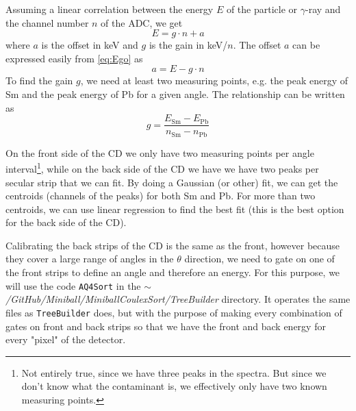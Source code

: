 \documentclass[twoside,english]{uiofysmaster/uiofysmaster}
\newcommand{\ga}{$\gamma$}
\begin{document}
Assuming a linear correlation between the energy $E$ of the particle or \ga-ray and the channel number $n$ of the ADC, we get
\begin{equation}\label{eq:Ego}
	E = g \cdot n + a
\end{equation}
where $a$ is the offset in keV and $g$ is the gain in keV/$n$. 
The offset $a$ can be expressed easily from \autoref{eq:Ego} as 
\begin{equation}\label{eq:offset}
	a = E - g \cdot n 
\end{equation}
To find the gain $g$, we need at least two measuring points, e.g. the peak energy of Sm and the peak energy of Pb for a given angle. 
The relationship can be written as 
\begin{equation}\label{eq:gain}
	g = \frac{E_{\text{Sm}} - E_{\text{Pb}}}{n_{\text{Sm}} - n_{\text{Pb}}}
\end{equation}

On the front side of the CD we only have two measuring points per angle interval\footnote{Not entirely true, since we have three peaks in the spectra. But since we don't know what the contaminant is, we effectively only have two known measuring points.}, while on the back side of the CD we have we have two peaks per secular strip that we can fit. 
By doing a Gaussian (or other) fit, we can get the centroids (channels of the peaks) for both Sm and Pb. 
For more than two centroids, we can use linear regression to find the best fit (this is the best option for the back side of the CD).

Calibrating the back strips of the CD is the same as the front, however because they cover a large range of angles in the $\theta$ direction, we need to gate on one of the front strips to define an angle and therefore an energy. For this purpose, we will use the code \texttt{AQ4Sort} in the \textit{$\sim$/GitHub/Miniball/MiniballCoulexSort/TreeBuilder} directory. It operates the same files as \texttt{TreeBuilder} does, but with the purpose of making every combination of gates on front and back strips so that we have the front and back energy for every "pixel" of the detector.
\end{document}
